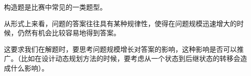 
构造题是比赛中常见的一类题型。

从形式上来看，问题的答案往往具有某种规律性，使得在问题规模迅速增大的时候，仍然有机会比较容易地得到答案。

这要求我们在解题时，要思考问题规模增长对答案的影响，这种影响是否可以推广。（比如在设计动态规划方法的时候，要考虑从一个状态到后继状态的转移会造成什么影响）。
